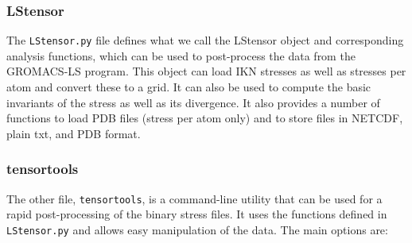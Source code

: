 \documentclass[10pt,letterpaper,notitlepage]{article}
\begin{document}
\subsubsection{LStensor}
The \texttt{LStensor.py} file defines what we call the LStensor object and corresponding analysis functions, which can be used to post-process the data from the GROMACS-LS program. This object can load IKN stresses as well as stresses per atom and convert these to a grid. It can also be used to compute the basic invariants of the stress as well as its divergence. It also provides a number of functions to load PDB files (stress per atom only) and to store files in NETCDF, plain txt, and PDB format.

\subsubsection{tensortools}
The other file, \texttt{tensortools}, is a command-line utility that can be used for a rapid post-processing of the binary stress files. It uses the functions defined in \texttt{LStensor.py} and allows easy manipulation of the data. The main options are:
\end{document}
